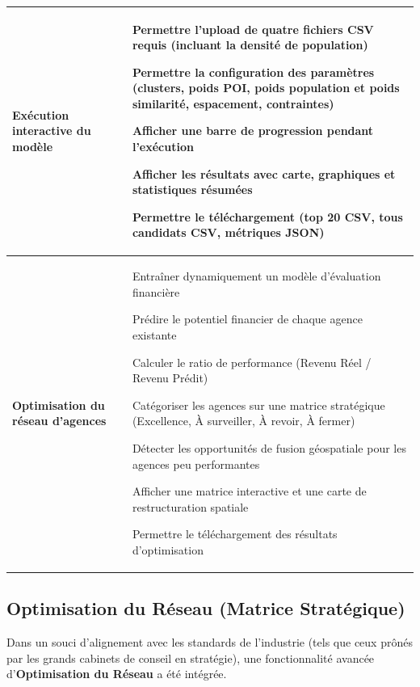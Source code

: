 \documentclass[11pt,a4paper,twoside]{report}
\begin{document}
\begin{longtable}{|p{3.5cm}|p{10.5cm}|}
\textbf{Exécution interactive du modèle} &
\begin{tblitem}
    \item Permettre l'upload de quatre fichiers CSV requis (incluant la densité de population)
    \item Permettre la configuration des paramètres (clusters, poids POI, poids population et poids similarité, espacement, contraintes)
    \item Afficher une barre de progression pendant l'exécution
    \item Afficher les résultats avec carte, graphiques et statistiques résumées
    \item Permettre le téléchargement (top 20 CSV, tous candidats CSV, métriques JSON)
\end{tblitem} \\
\hline

\textbf{Optimisation du réseau d'agences} &
\begin{tblitem}
    \item Entraîner dynamiquement un modèle d'évaluation financière
    \item Prédire le potentiel financier de chaque agence existante
    \item Calculer le ratio de performance (Revenu Réel / Revenu Prédit)
    \item Catégoriser les agences sur une matrice stratégique (Excellence, À surveiller, À revoir, À fermer)
    \item Détecter les opportunités de fusion géospatiale pour les agences peu performantes
    \item Afficher une matrice interactive et une carte de restructuration spatiale
    \item Permettre le téléchargement des résultats d'optimisation
\end{tblitem} \\

\end{longtable}
\endgroup

\subsection{Optimisation du Réseau (Matrice Stratégique)}

Dans un souci d'alignement avec les standards de l'industrie (tels que ceux prônés par les grands cabinets de conseil en stratégie), une fonctionnalité avancée d'\textbf{Optimisation du Réseau} a été intégrée. 
\end{document}

